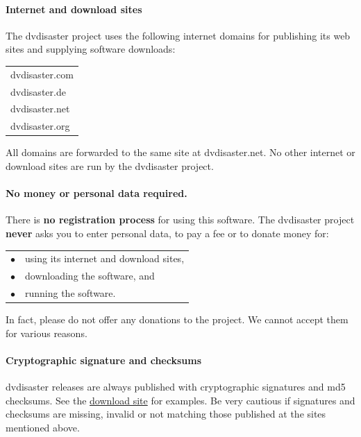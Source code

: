 \paragraph{Internet and download sites}\quad

\smallskip

The dvdisaster project uses the following internet domains for publishing
its web sites and supplying software downloads:

\begin{center}
  \begin{tabular}{l}
dvdisaster.com\\
dvdisaster.de\\
dvdisaster.net\\
dvdisaster.org
  \end{tabular}
\end{center}

All domains are forwarded to the same site at dvdisaster.net.
No other internet or download sites are run by the dvdisaster project.

\paragraph{No money or personal data required.}\quad

\smallskip

There is {\bf no registration process} for using this software.
The dvdisaster project {\bf never} asks you to enter personal data,
to pay a fee or to donate money for:

\smallskip

\begin{tabular}{ll}
$\bullet$ & using its internet and download sites,\\
$\bullet$ & downloading the software, and\\
$\bullet$ & running the software. \\
\end{tabular}

\smallskip

In fact, please do not offer any donations to the project. 
We cannot accept them for various reasons.

\paragraph{Cryptographic signature and checksums}\quad
\smallskip

dvdisaster releases are always published with cryptographic signatures
and md5 checksums. See the \href{https://web.archive.org/web/20180428070843/http://dvdisaster.net}{download site} for examples.
Be very cautious if signatures and checksums are missing, invalid or not
matching those published at the sites mentioned above.

